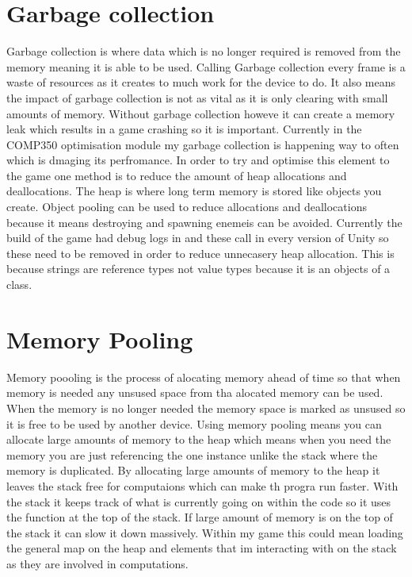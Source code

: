 \documentclass[journal]{IEEEtran}
\begin{document}
\section{Garbage collection}
Garbage collection is where data which is no longer required is removed from the memory meaning it is able to be used.%
Calling Garbage collection every frame is a waste of resources as it creates to much work for the device to do.
It also means the impact of garbage collection is not as vital as it is only clearing with small amounts of memory.
Without garbage collection howeve it can create a memory leak which results in a game crashing so it is important.
Currently in the COMP350 optimisation module my garbage collection is happening way to often which is dmaging its perfromance.
In order to try and optimise this element to the game one method is to reduce the amount of heap allocations and deallocations.
The heap is where long term memory is stored like objects you create.%
Object pooling can be used to reduce allocations and deallocations because it means destroying and spawning enemeis can be avoided.
Currently the build of the game had debug logs in and these call in every version of Unity so these need to be removed in order to reduce unnecasery heap allocation. 
This is because strings are reference types not value types because it is an objects of a class.

\section{Memory Pooling}
Memory poooling is the process of alocating memory ahead of time so that when memory is needed any unsused space from tha alocated memory can be used.
When the memory is no longer needed the memory space is marked as unsused so it is free to be used by another device.
Using memory pooling means you can allocate large amounts of memory to the heap which means when you need the memory you are just referencing the one instance unlike the stack where the memory is duplicated.%
By allocating large amounts of memory to the heap it leaves the stack free for computaions which can make th progra run faster.%
With the stack it keeps track of what is currently going on within the code so it uses the function at the top of the stack.
If large amount of memory is on the top of the stack it can slow it down massively.%
Within my game this could mean loading the general map on the heap and elements that im interacting with on the stack as they are involved in computations.


%
%


\end{document}
